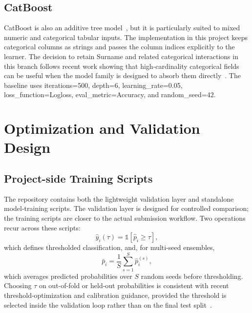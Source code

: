 \documentclass[conference]{IEEEtran}
\renewcommand{\texttt}[1]{\textnormal{#1}}
\begin{document}
\subsection{CatBoost}
CatBoost is also an additive tree model~\cite{catboost}, but it is particularly suited to mixed numeric and categorical tabular inputs. The implementation in this project keeps categorical columns as strings and passes the column indices explicitly to the learner. The decision to retain \texttt{Surname} and related categorical interactions in this branch follows recent work showing that high-cardinality categorical fields can be useful when the model family is designed to absorb them directly~\cite{matteucci2023encoders,avanzi2023highcardinality}. The baseline uses \texttt{iterations=500}, \texttt{depth=6}, \texttt{learning\_rate=0.05}, \texttt{loss\_function=Logloss}, \texttt{eval\_metric=Accuracy}, and \texttt{random\_seed=42}.

\section{Optimization and Validation Design}
\subsection{Project-side Training Scripts}
The repository contains both the lightweight validation layer and standalone model-training scripts. The validation layer is designed for controlled comparison; the training scripts are closer to the actual submission workflow. Two operations recur across these scripts:
\begin{equation}
\hat{y}_i(\tau) = \mathbb{1}[\hat{p}_i \ge \tau],
\end{equation}
which defines thresholded classification, and, for multi-seed ensembles,
\begin{equation}
\bar{p}_i = \frac{1}{S}\sum_{s=1}^{S} \hat{p}_i^{(s)},
\end{equation}
which averages predicted probabilities over $S$ random seeds before thresholding.
Choosing $\tau$ on out-of-fold or held-out probabilities is consistent with recent threshold-optimization and calibration guidance, provided the threshold is selected inside the validation loop rather than on the final test split~\cite{silva2023calibration,lee2023tcal,leevy2023threshold,kapoor2023leakage}.
\end{document}
